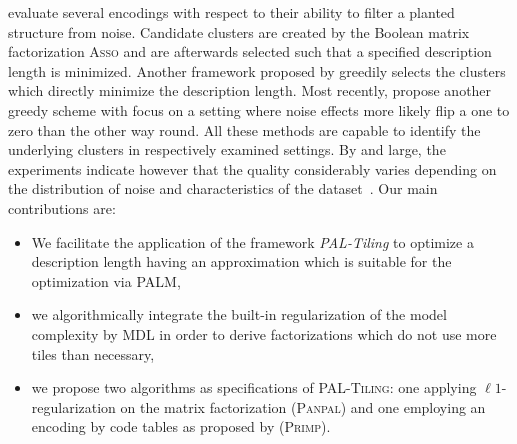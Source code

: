\cite{miettinen2014mdl4bmf} evaluate several encodings with respect to their ability to filter a planted structure from noise. Candidate clusters are created by the Boolean matrix factorization \textsc{Asso} and are afterwards selected such that a specified description length is minimized. Another framework proposed by \cite{lucchese2014unifying} greedily selects the clusters which directly minimize the description length. Most recently, \cite{karaev2015getting} propose another greedy scheme with focus on a setting where noise effects more likely flip a one to zero than the other way round. All these methods are capable to identify the underlying clusters in respectively examined settings. By and large, the experiments indicate however that the quality considerably varies depending on the distribution of noise and characteristics of the dataset~\citep{miettinen2014mdl4bmf,karaev2015getting}.  Our main contributions are:
\begin{itemize}
    \item We facilitate the application of the framework \emph{PAL-Tiling} to optimize a description length having an approximation which is suitable for the optimization via PALM, \item we algorithmically integrate the built-in regularization of the model complexity by MDL in order to derive factorizations which do not use more tiles than necessary,
    \item we propose two algorithms as specifications of \textsc{PAL-Tiling}: one applying $\ell 1$-regularization on the matrix factorization (\textsc{Panpal}) and one employing an encoding by code tables as proposed by \cite{siebes2006item} (\textsc{Primp}). 
\end{itemize}
 
